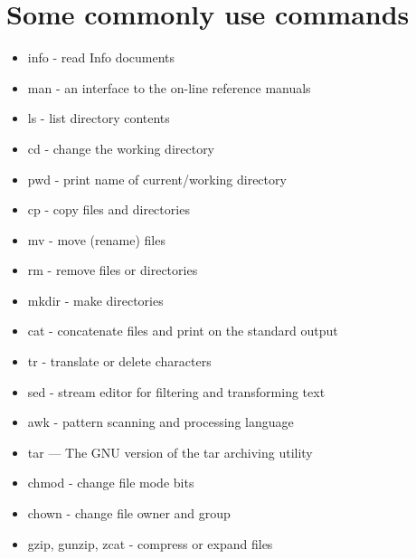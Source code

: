 
\section{Some commonly use commands}
\label{sec:commands}

\begin{itemize}
	\item info - read Info documents
	\item man - an interface to the on-line reference manuals
	\item ls - list directory contents
	\item cd - change the working directory
	\item pwd - print name of current/working directory
	\item cp - copy files and directories
	\item mv - move (rename) files
	\item rm - remove files or directories
	\item mkdir - make directories
	\item cat - concatenate files and print on the standard output
	\item tr - translate or delete characters
	\item sed - stream editor for filtering and transforming text
	\item awk - pattern scanning and processing language
	\item tar — The GNU version of the tar archiving utility
	\item chmod - change file mode bits
	\item chown - change file owner and group
	\item gzip, gunzip, zcat - compress or expand files
\end{itemize}
